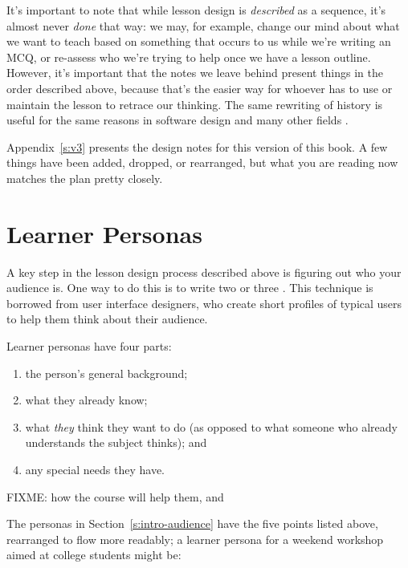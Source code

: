 It's important to note that while lesson design is \emph{described} as a
sequence, it's almost never \emph{done} that way: we may, for example,
change our mind about what we want to teach based on something that
occurs to us while we're writing an MCQ, or re-assess who we're trying
to help once we have a lesson outline. However, it's important that
the notes we leave behind present things in the order described above,
because that's the easier way for whoever has to use or maintain the
lesson to retrace our thinking. The same rewriting of history is
useful for the same reasons in software design and many other fields
\cite{Parn1986}.

Appendix~\ref{s:v3} presents the design notes for this version of this
book. A few things have been added, dropped, or rearranged, but what
you are reading now matches the plan pretty closely.

\section{Learner Personas}\label{s:process-personas}

A key step in the lesson design process described above is figuring
out who your audience is. One way to do this is to write two or three
. This technique is
borrowed from user interface designers, who create short profiles of
typical users to help them think about their audience.

Learner personas have four parts:

\begin{enumerate}
\item
  the person's general background;
\item
  what they already know;
\item
  what \emph{they} think they want to do (as opposed to what someone who already
  understands the subject thinks); and
\item
  any special needs they have.
\end{enumerate}

FIXME: how the course will help them, and

The personas in Section~\ref{s:intro-audience} have the five points listed above,
rearranged to flow more readably; a learner persona for a weekend workshop aimed
at college students might be:

